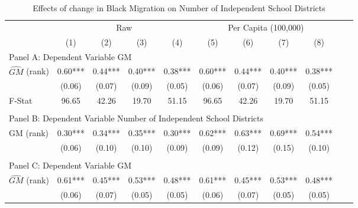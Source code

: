  \begin{table}[htbp]\centering {} \begin{threeparttable} \caption{Effects of change in Black Migration on Number of Independent School Districts} \begin{tabular}{l*{10}{c}} \toprule
                &\multicolumn{4}{c}{Raw}                                    &\multicolumn{4}{c}{Per Capita (100,000)}                   \\\cmidrule(lr){2-5}\cmidrule(lr){6-9}
                &\multicolumn{1}{c}{(1)}   &\multicolumn{1}{c}{(2)}   &\multicolumn{1}{c}{(3)}   &\multicolumn{1}{c}{(4)}   &\multicolumn{1}{c}{(5)}   &\multicolumn{1}{c}{(6)}   &\multicolumn{1}{c}{(7)}   &\multicolumn{1}{c}{(8)}   \\
\cmidrule(lr){1-9}
\multicolumn{8}{l}{Panel A: Dependent Variable GM}\\
\cmidrule(lr){1-9}
$\hat{GM}$ (rank)&       0.60***&       0.44***&       0.40***&       0.38***&       0.60***&       0.44***&       0.40***&       0.38***\\
                &     (0.06)   &     (0.07)   &     (0.09)   &     (0.05)   &     (0.06)   &     (0.07)   &     (0.09)   &     (0.05)   \\
\midrule
F-Stat          &      96.65   &      42.26   &      19.70   &      51.15   &      96.65   &      42.26   &      19.70   &      51.15   \\
\cmidrule[\heavyrulewidth](lr){1-9} \\ \cmidrule[\heavyrulewidth](lr){1-9}
\multicolumn{8}{l}{Panel B: Dependent Variable Number of Independent School Districts}\\
\cmidrule(lr){1-9}
GM  (rank)      &       0.30***&       0.34***&       0.35***&       0.30***&       0.62***&       0.63***&       0.69***&       0.54***\\
                &     (0.06)   &     (0.10)   &     (0.10)   &     (0.09)   &     (0.09)   &     (0.12)   &     (0.15)   &     (0.10)   \\
\cmidrule[\heavyrulewidth](lr){1-9} \\ \cmidrule[\heavyrulewidth](lr){1-9}
\multicolumn{8}{l}{Panel C: Dependent Variable GM}\\
\cmidrule(lr){1-9}
$\hat{GM}$ (rank)&       0.61***&       0.45***&       0.53***&       0.48***&       0.61***&       0.45***&       0.53***&       0.48***\\
                &     (0.06)   &     (0.07)   &     (0.05)   &     (0.05)   &     (0.06)   &     (0.07)   &     (0.05)   &     (0.05)   \\

\end{tabular}
\end{threeparttable}
\end{table}
